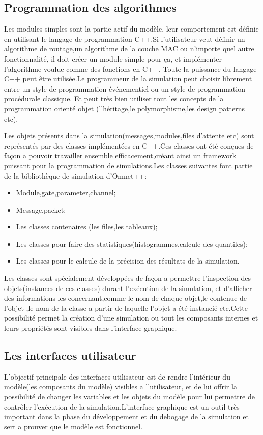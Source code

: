\subsection{Programmation des algorithmes}

Les modules simples sont la partie actif du modèle, leur comportement est définie en utilisant le langage de programmation C++.Si l'utilisateur veut définir un algorithme de routage,un algorithme de la couche MAC ou n'importe quel autre fonctionnalité, il doit créer un module simple pour ça, et implémenter l'algorithme voulue comme des fonctions en C++.
Toute la puissance du langage C++ peut être utilisée.Le programmeur de la simulation peut choisir librement entre un style de programmation événementiel ou un style de programmation procédurale classique. Et peut très bien utiliser tout les concepts de la programmation orienté objet (l'héritage,le polymorphisme,les design patterns etc).

Les objets présents dans la simulation(messages,modules,files d'attente etc) sont représentés par des classes implémentées en C++.Ces classes ont été conçues de façon a pouvoir travailler ensemble efficacement,créant ainsi  un framework puissant pour la programmation de simulations.Les classes suivantes font partie de la bibliothèque de simulation d'Omnet++:

\begin{itemize}

\item Module,gate,parameter,channel;
\item Message,packet;
\item Les classes contenaires (les files,les tableaux);
\item Les classes pour faire des statistiques(histogrammes,calcule des quantiles);
\item Les classes pour le calcule de la précision des résultats de la simulation.
\end{itemize} 

Les classes sont spécialement développées de façon a permettre l'inspection des objets(instances de ces classes) durant l'exécution de la simulation, et d'afficher des informations les concernant,comme le nom de chaque objet,le contenue de l'objet ,le nom de la classe a partir de laquelle l'objet a été instancié etc.Cette possibilité permet la création d'une simulation ou tout les composants internes et leurs propriétés sont visibles dans l'interface graphique.

\subsection{Les interfaces utilisateur}
L'objectif principale des interfaces utilisateur est de rendre l'intérieur du modèle(les composants du modèle) visibles a l'utilisateur, et de lui offrir la possibilité de changer les variables et les objets du modèle pour lui permettre de contrôler l'exécution de la simulation.L'interface graphique est un outil très important dans la phase du développement et du debogage de la simulation et sert a prouver que le modèle est fonctionnel.

